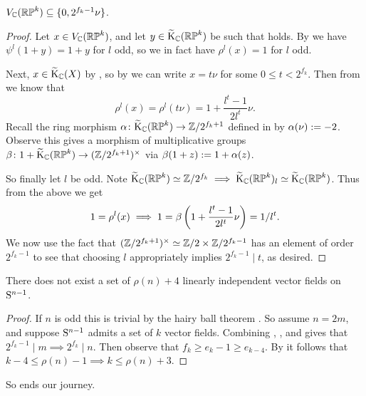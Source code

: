 \begin{lemma}
  \label{RP-jprime}
  $V_\C(\RP^k) \subseteq \{0,2^{f_k-1}\nu\}$.
\end{lemma}

\begin{proof}
  Let $x \in V_\C(\RP^k)$, and let $y \in \wt\K_\C(\RP^k)$ be such
  that  holds. By  we have $\psi^l(1+y) =
  1+y$ for $l$ odd, so we in fact have $\rho^l(x) = 1$ for $l$ odd.

  Next, $x \in \wt\K_\C(X)$ by , so by 
  we can write $x = t\nu$ for some $0 \le t < 2^{f_k}$. Then from
   we know that
  \[
  \rho^l(x) = \rho^l(t\nu) = 1 + \frac{l^t-1}{2l^t}\nu.
  \]
  Recall the ring morphism $\alpha \c \wt\K_\C(\RP^k) \to
  \Z/2^{f_k+1}$ defined in  by $\alpha(\nu) \ce
  -2$. Observe this gives a morphism of multiplicative groups $\beta
  \c 1 + \wt\K_\C(\RP^k) \to (\Z/2^{f_k+1})^\times$ via $\beta(1+z)
  \ce 1+\alpha(z)$.

  So finally let $l$ be odd. Note $\wt\K_\C(\RP^k) \simeq \Z/2^{f_k}
  \implies \wt\K_\C(\RP^k)_l \simeq \wt\K_\C(\RP^k)$. Thus from the
  above we get
  \[
  1 = \rho^l(x) \implies 1 = \beta\l(1 + \frac{l^t-1}{2l^t}\nu\r) =
  1/l^t.
  \]
  We now use the fact that $(\Z/2^{f_k+1})^\times \simeq \Z/2 \times
  \Z/2^{f_k-1}$ has an element of order $2^{f_k-1}$ to see that
  choosing $l$ appropriately implies $2^{f_k-1} \mid t$, as desired.
\end{proof}

\begin{theorem}
  \label{complex-upper}
  There does not exist a set of $\rho(n) + 4$ linearly independent
  vector fields on $\S^{n-1}$.
\end{theorem}

\begin{proof}
  If $n$ is odd this is trivial by the hairy ball theorem
  . So assume $n = 2m$, and suppose $\S^{n-1}$ admits
  a set of $k$ vector fields. Combining ,
  , and  gives that $2^{f_k-1} \mid
  m \implies 2^{f_k} \mid n$. Then observe that $f_k \ge e_k - 1 \ge
  e_{k-4}$. By  it follows that $k-4 \le \rho(n) - 1
  \implies k \le \rho(n) + 3$.
\end{proof}

So ends our journey.

